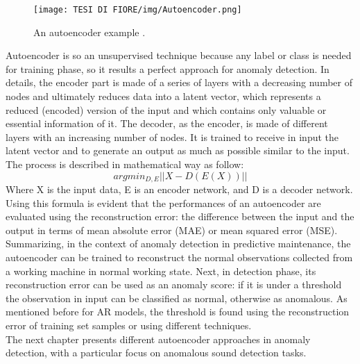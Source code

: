 \begin{figure}[ht]
\texttt{[image: TESI DI FIORE/img/Autoencoder.png]}
\centering
\caption{An autoencoder example \cite{10Autoencoders}.}
\label{autoencoder_image}
\end{figure}
Autoencoder is so an unsupervised technique because any label or class is needed for training phase, so it results a perfect approach for anomaly detection. In details, the encoder part is made of a series of layers with a decreasing number of nodes and ultimately reduces data into a latent vector, which represents a reduced (encoded) version of the input and which contains only valuable or essential information of it. The decoder, as the encoder, is made of different layers with an increasing number of nodes. It is trained to receive in input the latent vector and to generate an output as much as possible similar to the input. The process is described in mathematical way as follow:
\[argmin_{D,E} || X - D(E(X))||\]
Where X is the input data, E is an encoder network, and D is a decoder network. Using this formula is evident that the performances of an autoencoder are evaluated using the reconstruction error: the difference between the input and the output in terms of mean absolute error (MAE) or mean squared error (MSE).\\
Summarizing, in the context of anomaly detection in predictive maintenance, the autoencoder can be trained to reconstruct the normal observations collected from a working machine in normal working state. Next, in detection phase, its reconstruction error can be used as an anomaly score: if it is under a threshold the observation in input can be classified as normal, otherwise as anomalous. As mentioned before for AR models, the threshold is found using the reconstruction error of training set samples or using different techniques.\\
The next chapter presents different autoencoder approaches in anomaly detection, with a particular focus on anomalous sound detection tasks.

